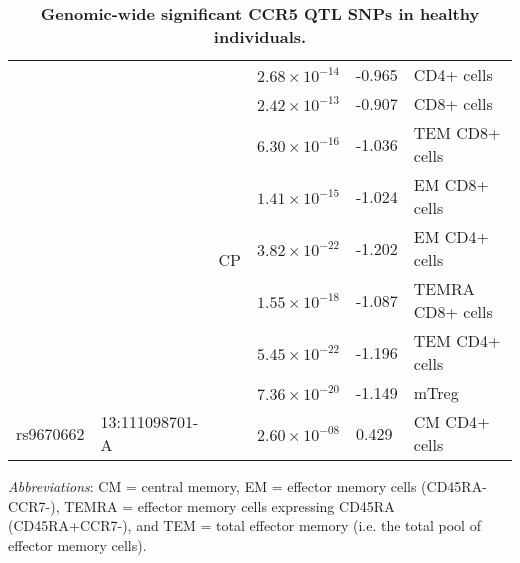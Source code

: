 \documentclass{book}
\begin{document}
\begin{refsection}
\begin{table}[H]
\begin{tabular}{llllll}
    \cline{3-6}
                                  &                                & \multirow{9}{*}{CP}  & $2.68 \times 10^{-14}$ & -0.965 & CD4+ cells \\
                                  &                                &                      & $2.42 \times 10^{-13}$ & -0.907 & CD8+ cells \\
                                  &                                &                      & $6.30 \times 10^{-16}$ & -1.036 & TEM CD8+ cells \\
                                  &                                &                      & $1.41 \times 10^{-15}$ & -1.024 & EM CD8+ cells \\
                                  &                                &                      & $3.82 \times 10^{-22}$ & -1.202 & EM CD4+ cells \\
                                  &                                &                      & $1.55 \times 10^{-18}$ & -1.087 & TEMRA CD8+ cells \\
                                  &                                &                      & $5.45 \times 10^{-22}$ & -1.196 & TEM CD4+ cells \\
                                  &                                &                      & $7.36 \times 10^{-20}$ & -1.149 & mTreg \\
    \cline{1-2} \cline{4-6}
    rs9670662                     & 13:111098701-A                 &                      & $2.60 \times 10^{-08}$ & 0.429 & CM CD4+ cells \\
    \hline
  \end{tabular}
  \caption{\label{tab:chp5suptab2} \textbf{Genomic-wide significant CCR5 QTL SNPs in healthy individuals.}}
  \textit{Abbreviations}: CM = central memory, EM = effector memory cells (CD45RA-CCR7-), TEMRA = effector memory cells expressing CD45RA (CD45RA+CCR7-), and TEM = total effector memory (i.e. the total pool of effector memory cells).
\end{table}



\end{refsection}
\end{document}
